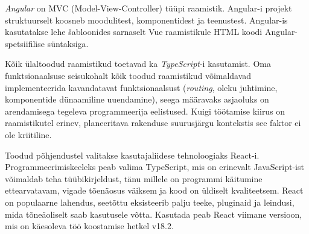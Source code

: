 \textit{Angular} on MVC (Model-View-Controller) tüüpi raamistik. Angular-i projekt struktuurselt koosneb
moodulitest, komponentidest ja teenustest. Angular-is kasutatakse lehe šabloonides sarnaselt Vue raamistikule
HTML koodi Angular-spetsiifilise süntaksiga. 

Kõik ülaltoodud raamistikud toetavad ka \textit{TypeScript}-i kasutamist. Oma funktsionaalsuse seisukohalt
kõik toodud raamistikud võimaldavad implementeerida kavandatavat funktsionaalsust (\textit{routing}, 
oleku juhtimine, komponentide dünaamiline uuendamine), seega määravaks asjaoluks on arendamisega tegeleva 
programmeerija eelistused. Kuigi töötamise kiirus on raamistikutel erinev, planeeritava rakenduse suurusjärgu
kontekstis see faktor ei ole kriitiline. 

Toodud põhjendustel valitakse kasutajaliidese tehnoloogiaks React-i. Programmeerimiskeeleks peab valima TypeScript, 
mis on erinevalt JavaScript-ist võimaldab teha tüübikirjeldust, tänu millele on programmi käitumine ettearvatavam, 
vigade tõenäosus väiksem ja kood on üldiselt kvaliteetsem. React on populaarne lahendus, seetõttu eksisteerib palju
teeke, pluginaid ja leindusi, mida tõneäoliselt saab kasutusele võtta. Kasutada peab React viimane versioon,
mis on käesoleva töö koostamise hetkel v18.2.


